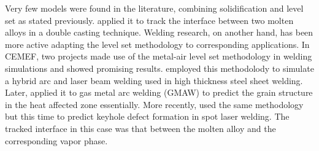 Very few models were found in the literature, combining solidification and level set as stated previously. 
\citet{du_simulating_2001} applied it to track the interface between two molten alloys in a double casting technique. 
Welding research, on another hand, has been more active adapting the level set methodology to corresponding applications. 
In CEMEF, two projects made use of the metal-air level set methodology in welding simulations and showed promising results. 
\citet{desmaison_level_2014} employed this methodolody to simulate a hybrid arc and laser beam welding 
used in high thickness steel sheet welding. Later, \citet{chen_three_2014} applied it to gas metal arc welding (GMAW) to predict 
the grain structure in the heat affected zone essentially.
More recently, \citet{courtois_complete_2014} used the same methodology but this time to predict keyhole defect formation
in spot laser welding. The tracked interface in this case was that between the molten alloy and the corresponding vapor phase.
%
%

